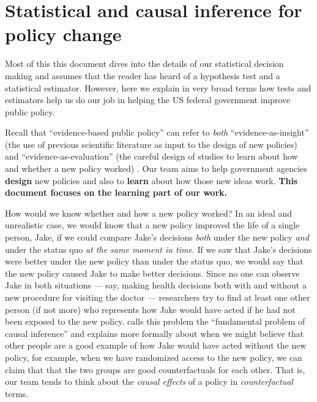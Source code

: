 \documentclass[
  12pt,
]{book}
\theoremstyle{definition}
\theoremstyle{definition}
\theoremstyle{definition}
\theoremstyle{remark}
\begin{document}
\hypertarget{statistical-and-causal-inference-for-policy-change}{%
\chapter{Statistical and causal inference for policy
change}\label{statistical-and-causal-inference-for-policy-change}}

Most of this this document dives into the details of our statistical
decision making and assumes that the reader has heard of a hypothesis
test and a statistical estimator. However, here we explain in very broad
terms how tests and estimators help us do our job in helping the US
federal government improve public policy.

Recall that ``evidence-based public policy'' can refer to \emph{both}
``evidence-as-insight'' (the use of previous scientific literature as
input to the design of new policies) and ``evidence-as-evaluation'' (the
careful design of studies to learn about how and whether a new policy
worked) \citep{bowers2019better}. Our team aims to help government
agencies \textbf{design} new policies and also to \textbf{learn} about
how those new ideas work. \textbf{This document focuses on the learning
part of our work.}

How would we know whether and how a new policy worked? In an ideal and
unrealistic case, we would know that a new policy improved the life of a
single person, Jake, if we could compare Jake's decisions \emph{both}
under the new policy \emph{and} under the status quo \emph{at the same
moment in time}. If we saw that Jake's decisions were better under the
new policy than under the status quo, we would say that the new policy
caused Jake to make better decisions. Since no one can observe Jake in
both situations --- say, making health decisions both with and without a
new procedure for visiting the doctor --- researchers try to find at
least one other person (if not more) who represents how Jake would have
acted if he had not been exposed to the new policy.
\citet{holland:1986a} calls this problem the ``fundamental problem of
causal inference'' and explains more formally about when we might
believe that other people are a good example of how Jake would have
acted without the new policy, for example, when we have randomized
access to the new policy, we can claim that that the two groups are good
counterfactuals for each other. That is, our team tends to think about
the \emph{causal effects} of a policy in \emph{counterfactual} terms.
\end{document}
